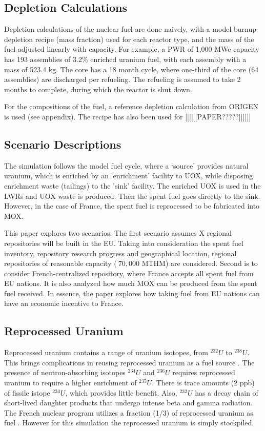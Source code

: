 \subsection{Depletion Calculations}
Depletion calculations of the nuclear fuel are done
naively, with a model burnup depletion recipe (mass fraction) used
for each reactor type, and the mass of the fuel 
adjusted linearly with capacity. For example, a PWR of
1,000 MWe capacity has 193 assemblies of 3.2\% enriched
uranium fuel, with each assembly with a mass of 523.4 kg.
The core has a 18 month cycle, where one-third of the 
core (64 assemblies) are discharged per refueling. The refueling
is assumed to take 2 months to complete, during which the reactor
is shut down. 

For the compositions of the fuel, a reference depletion calculation
from ORIGEN is used (see appendix). The recipe has also been used for
[[[[[[PAPER?????]]]]]]

\subsection{Scenario Descriptions}
The simulation follows the model fuel cycle, where a `source'
provides natural uranium, which is enriched by an 'enrichment'
facility to \gls{UOX}, while disposing enrichment waste (tailings)
to the 'sink' facility. The enriched \gls{UOX} is used
in the \gls{LWR}s and \gls{UOX} waste is produced. Then the spent fuel
goes directly to the sink. However, in the case of France, the spent fuel
is reprocessed to be fabricated into \gls{MOX}.


This paper explores two scenarios.
The first scenario assumes X regional repositories will be built
in the EU. Taking into consideration 
the spent fuel inventory, repository research progress and geographical location,
regional repositories of reasonable capacity ($~70,000$ MTHM) are considered.
Second is to consider French-centralized repository, where France accepts all
spent fuel from EU nations. It is also analyzed how much \gls{MOX} can be produced
from the spent fuel received. In essence, the paper explores how taking fuel
from EU nations can have an economic incentive to France.



\subsection{Reprocessed Uranium}
Reprocessed uranium contains a range of uranium isotopes, from $^{232}U$ to $^{238}U$.
This brings complications in reusing reprocessed uranium as a fuel source \cite{IAEA_management_2007}.
The presence of neutron-absorbing isotopes $^{234}U$ and $^{236}U$ requires reprocessed uranium
to require a higher enrichment of $^{235}U$. There is trace amounts (2 ppb) of fissile istope $^{233}U$,
which provides little benefit.  
Also, $^{232}U$ has a decay chain of short-lived
daughter products that undergo intense beta and gamma radiation.
The French nuclear program utilizes a fraction (1/3) of reprocessed uranium as fuel \cite{IAEA_management_200&}.
However for this simulation the reprocessed uranium is simply stockpiled.


